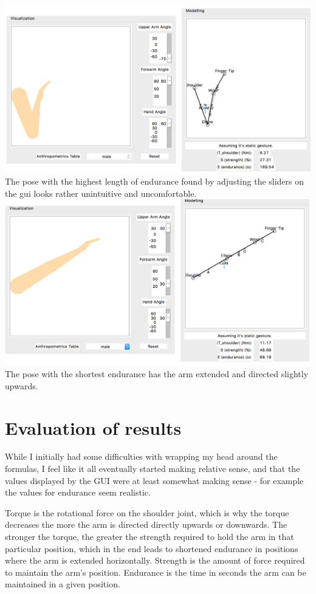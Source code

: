 \documentclass{article}
\begin{document}
\includegraphics[width=\textwidth,height=\textheight,keepaspectratio]{gui1}\newline
The pose with the highest length of endurance found by adjusting the sliders on the gui looks rather unintuitive and uncomfortable. \vspace*{5mm}\newline
\includegraphics[width=\textwidth,height=\textheight,keepaspectratio]{gui2}\newline
The pose with the shortest endurance has the arm extended and directed slightly upwards.
\vspace*{5mm}
\pagebreak
\section{Evaluation of results}
While I initially had some difficulties with wrapping my head around the formulas, I feel like it all eventually started making relative sense, and that the values displayed by the GUI were at least somewhat making sense - for example the values for endurance seem realistic.

Torque is the rotational force on the shoulder joint, which is why the torque decreases the more the arm is directed directly upwards or downwards. The stronger the torque, the greater the strength required to hold the arm in that particular position, which in the end leads to shortened endurance in positions where the arm is extended horizontally. Strength is the amount of force required to maintain the arm's position. Endurance is the time in seconds the arm can be maintained in a given position.
\end{document}
